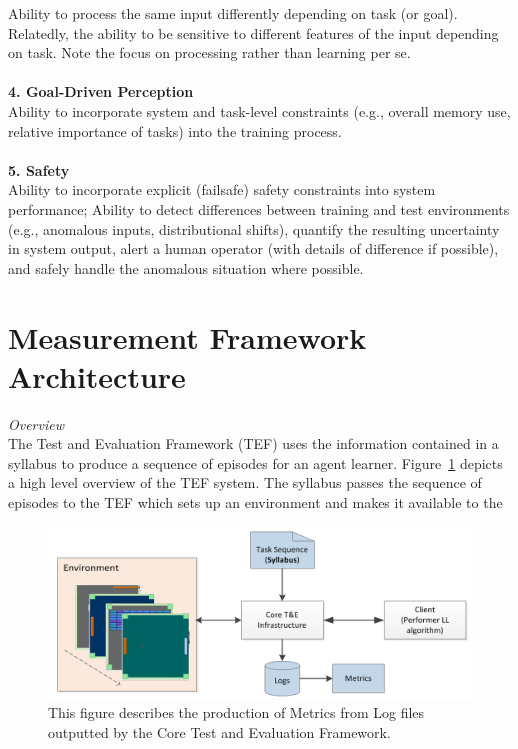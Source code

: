 Ability to process the same input differently depending on task (or goal). Relatedly, the ability to be sensitive to different features of the input depending on task. Note the focus on processing rather than learning per se.\\
\\
\textbf{4. Goal-Driven Perception}\\

Ability to incorporate system and task-level constraints (e.g., overall memory use, relative importance of tasks) into the training process.\\
\\
\textbf{5. Safety}\\

Ability to incorporate explicit (failsafe) safety constraints into system performance; Ability to detect differences between training and test environments (e.g., anomalous inputs, distributional shifts), quantify the resulting uncertainty in system output, alert a human operator (with details of difference if possible), and safely handle the anomalous situation where possible.

\section{Measurement Framework Architecture}

\textit{Overview}
\\

The Test and Evaluation Framework (TEF) uses the information contained in a syllabus to produce a sequence of episodes for an agent learner. Figure~\ref{fig:systemlayout} depicts a high level overview of the TEF system. The syllabus passes the sequence of episodes to the TEF which sets up an environment and makes it available to the 

\begin{figure}[h]
	\centering
	\includegraphics[width=0.85\columnwidth]{sections/figs/metrics_diagram.png}
	\caption{This figure describes the production of Metrics from Log files outputted by the Core Test and Evaluation Framework.}
	\label{fig:systemlayout}
\end{figure}


